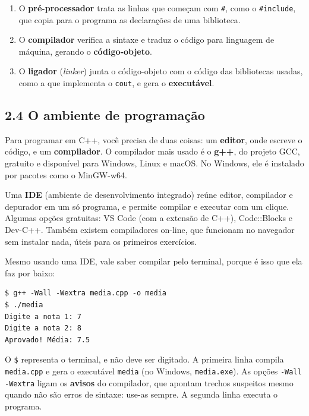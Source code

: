 \begin{enumerate}
  \item O \textbf{pré-processador} trata as linhas que começam com \texttt{\#}, como o \texttt{\#include}, que copia para o programa as declarações de uma biblioteca.
  \item O \textbf{compilador} verifica a sintaxe e traduz o código para linguagem de máquina, gerando o \textbf{código-objeto}.
  \item O \textbf{ligador} (\textit{linker}) junta o código-objeto com o código das bibliotecas usadas, como a que implementa o \texttt{cout}, e gera o \textbf{executável}.
\end{enumerate}

\subsection{2.4 O ambiente de programação}

Para programar em C++, você precisa de duas coisas: um \textbf{editor}, onde escreve o código, e um \textbf{compilador}. O compilador mais usado é o \textbf{g++}, do projeto GCC, gratuito e disponível para Windows, Linux e macOS. No Windows, ele é instalado por pacotes como o MinGW-w64.

Uma \textbf{IDE} (ambiente de desenvolvimento integrado) reúne editor, compilador e depurador em um só programa, e permite compilar e executar com um clique. Algumas opções gratuitas: VS Code (com a extensão de C++), Code::Blocks e Dev-C++. Também existem compiladores on-line, que funcionam no navegador sem instalar nada, úteis para os primeiros exercícios.

Mesmo usando uma IDE, vale saber compilar pelo terminal, porque é isso que ela faz por baixo:

\begin{codigo}
\begin{Verbatim}[breaklines=true, breaksymbolleft={}, fontsize=\footnotesize]
$ g++ -Wall -Wextra media.cpp -o media
$ ./media
Digite a nota 1: 7
Digite a nota 2: 8
Aprovado! Média: 7.5
\end{Verbatim}
\end{codigo}

O \texttt{\$} representa o terminal, e não deve ser digitado. A primeira linha compila \texttt{media.cpp} e gera o executável \texttt{media} (no Windows, \texttt{media.exe}). As opções \texttt{-Wall -Wextra} ligam os \textbf{avisos} do compilador, que apontam trechos suspeitos mesmo quando não são erros de sintaxe: use-as sempre. A segunda linha executa o programa.

